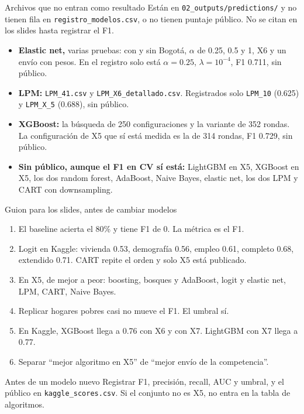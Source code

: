 \documentclass[aspectratio=169,10pt]{beamer}
\begin{document}
\begin{frame}{Archivos que no entran como resultado}
  Están en \texttt{02\_outputs/predictions/} y no tienen fila en \texttt{registro\_modelos.csv}, o no tienen puntaje público. No se citan en los slides hasta registrar el F1.
  \vspace{0.4em}
  \footnotesize
  \begin{itemize}
    \item \textbf{Elastic net,} varias pruebas: con y sin Bogotá, $\alpha$ de 0.25, 0.5 y 1, X6 y un envío con pesos. En el registro solo está $\alpha=0.25$, $\lambda=10^{-4}$, F1 0.711, sin público.
    \item \textbf{LPM:} \texttt{LPM\_41.csv} y \texttt{LPM\_X6\_detallado.csv}. Registrados solo \texttt{LPM\_10} (0.625) y \texttt{LPM\_X\_5} (0.688), sin público.
    \item \textbf{XGBoost:} la búsqueda de 250 configuraciones y la variante de 352 rondas. La configuración de X5 que sí está medida es la de 314 rondas, F1 0.729, sin público.
    \item \textbf{Sin público, aunque el F1 en CV sí está:} LightGBM en X5, XGBoost en X5, los dos random forest, AdaBoost, Naive Bayes, elastic net, los dos LPM y CART con downsampling.
  \end{itemize}
\end{frame}

\begin{frame}{Guion para los slides, antes de cambiar modelos}
  \small
  \setlength{\itemsep}{0.28em}
  \begin{enumerate}
    \item El baseline acierta el 80\% y tiene F1 de 0. La métrica es el F1.
    \item Logit en Kaggle: vivienda 0.53, demografía 0.56, empleo 0.61, completo 0.68, extendido 0.71. CART repite el orden y solo X5 está publicado.
    \item En X5, de mejor a peor: boosting, bosques y AdaBoost, logit y elastic net, LPM, CART, Naive Bayes.
    \item Replicar hogares pobres casi no mueve el F1. El umbral sí.
    \item En Kaggle, XGBoost llega a 0.76 con X6 y con X7. LightGBM con X7 llega a 0.77.
    \item Separar ``mejor algoritmo en X5'' de ``mejor envío de la competencia''.
  \end{enumerate}
  \vspace{0.15em}
  \begin{block}{Antes de un modelo nuevo}
    Registrar F1, precisión, recall, AUC y umbral, y el público en \texttt{kaggle\_scores.csv}. Si el conjunto no es X5, no entra en la tabla de algoritmos.
  \end{block}
\end{frame}
\end{document}
